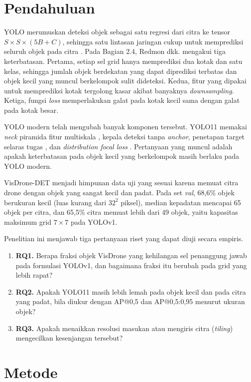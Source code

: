 \section{Pendahuluan}
YOLO merumuskan deteksi objek sebagai satu regresi dari citra ke tensor $S\times S\times(5B+C)$, sehingga satu lintasan jaringan cukup untuk memprediksi seluruh objek pada citra \cite{redmon2016}. Pada Bagian 2.4, Redmon dkk. mengakui tiga keterbatasan. Pertama, setiap sel grid hanya memprediksi dua kotak dan satu kelas, sehingga jumlah objek berdekatan yang dapat diprediksi terbatas dan objek kecil yang muncul berkelompok sulit dideteksi. Kedua, fitur yang dipakai untuk memprediksi kotak tergolong kasar akibat banyaknya \textit{downsampling}. Ketiga, fungsi \textit{loss} memperlakukan galat pada kotak kecil sama dengan galat pada kotak besar.

YOLO modern telah mengubah banyak komponen tersebut. YOLO11 \cite{jocher2024} memakai \textit{neck} piramida fitur multiskala \cite{lin2017fpn}, kepala deteksi tanpa \textit{anchor}, penetapan target selaras tugas \cite{feng2021tood}, dan \textit{distribution focal loss} \cite{li2020gfl}. Pertanyaan yang muncul adalah apakah keterbatasan pada objek kecil yang berkelompok masih berlaku pada YOLO modern.

VisDrone-DET \cite{du2019visdrone} menjadi himpunan data uji yang sesuai karena memuat citra drone dengan objek yang sangat kecil dan padat. Pada set \textit{val}, 68,6\% objek berukuran kecil (luas kurang dari $32^2$ piksel), median kepadatan mencapai 65 objek per citra, dan 65,5\% citra memuat lebih dari 49 objek, yaitu kapasitas maksimum grid $7\times7$ pada YOLOv1.

Penelitian ini menjawab tiga pertanyaan riset yang dapat diuji secara empiris.
\begin{enumerate}
\item \textbf{RQ1.} Berapa fraksi objek VisDrone yang kehilangan sel penanggung jawab pada formulasi YOLOv1, dan bagaimana fraksi itu berubah pada grid yang lebih rapat?
\item \textbf{RQ2.} Apakah YOLO11 masih lebih lemah pada objek kecil dan pada citra yang padat, bila diukur dengan AP@0,5 dan AP@0,5:0,95 menurut ukuran objek?
\item \textbf{RQ3.} Apakah menaikkan resolusi masukan atau mengiris citra (\textit{tiling}) mengecilkan kesenjangan tersebut?
\end{enumerate}

\section{Metode}
